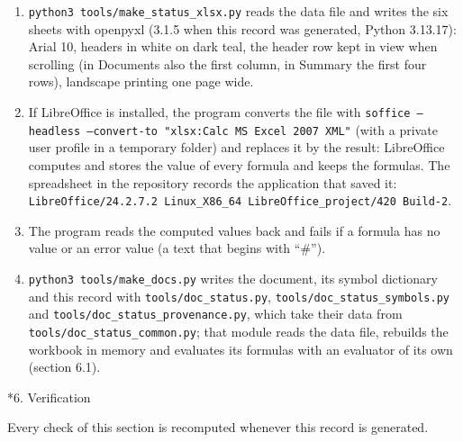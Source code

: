 \documentclass[10pt,a4paper]{article}
\makeatletter
\renewcommand\section{\@startsection{section}{1}{\z@}{-3.5ex \@plus -1ex \@minus -.2ex}{2.3ex \@plus.2ex}{\normalfont\Large\bfseries\raggedright}}
\makeatother
\begin{document}
\begin{enumerate}
\item \texttt{python3 tools/\allowbreak{}make\_\allowbreak{}status\_\allowbreak{}xlsx.py} reads the data file and writes the six sheets with openpyxl (3.1.5 when this record was generated, Python 3.13.17): Arial 10, headers in white on dark teal, the header row kept in view when scrolling (in Documents also the first column, in Summary the first four rows), landscape printing one page wide.
\item If LibreOffice is installed, the program converts the file with \texttt{soffice --headless --convert-to "xlsx:Calc MS Excel 2007 XML"} (with a private user profile in a temporary folder) and replaces it by the result: LibreOffice computes and stores the value of every formula and keeps the formulas. The spreadsheet in the repository records the application that saved it: \texttt{LibreOffice/\allowbreak{}24.2.7.2 Linux\_\allowbreak{}X86\_\allowbreak{}64 LibreOffice\_\allowbreak{}project/\allowbreak{}420 Build-2}.
\item The program reads the computed values back and fails if a formula has no value or an error value (a text that begins with “\#”).
\item \texttt{python3 tools/\allowbreak{}make\_\allowbreak{}docs.py} writes the document, its symbol dictionary and this record with \texttt{tools/\allowbreak{}doc\_\allowbreak{}status.py}, \texttt{tools/\allowbreak{}doc\_\allowbreak{}status\_\allowbreak{}symbols.py} and \texttt{tools/\allowbreak{}doc\_\allowbreak{}status\_\allowbreak{}provenance.py}, which take their data from \texttt{tools/\allowbreak{}doc\_\allowbreak{}status\_\allowbreak{}common.py}; that module reads the data file, rebuilds the workbook in memory and evaluates its formulas with an evaluator of its own (section 6.1).
\end{enumerate}
\section*{6. Verification}
Every check of this section is recomputed whenever this record is generated.
\end{document}

